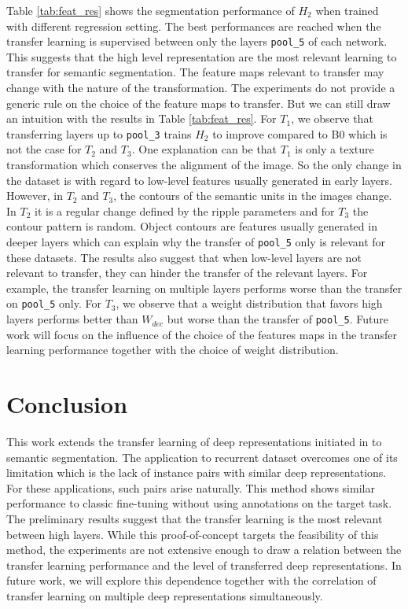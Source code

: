 \documentclass{bmvc2k}
\begin{document}
Table \ref{tab:feat_res} shows the segmentation performance of $H_2$ when trained 
with different regression setting. The best performances are reached
when the transfer learning
is supervised between only the layers \texttt{pool\_5} of each network. 
This suggests that
 the high level representation are the most relevant learning to transfer for 
semantic segmentation. 
The feature maps relevant to transfer may change with the nature of 
the transformation. The experiments do not provide a generic rule on
the choice of the feature maps to transfer. But we can still draw an intuition with 
the results in Table \ref{tab:feat_res}. 
For $T_1$, we observe that transferring layers up to {\tt pool\_3} trains $H_2$ to 
improve compared to B0 which is not the case for $T_2$ and $T_3$. One explanation 
can be that $T_1$ is only a texture transformation which conserves the alignment 
of the image. So the only change in the dataset is with regard to low-level
features usually generated in early layers. However, in $T_2$ and $T_3$, the 
contours of the semantic units in the images change. In $T_2$ it is a regular 
change defined by the ripple parameters and for $T_3$ the contour pattern is 
random. Object contours are features usually generated in deeper layers which 
can explain why the transfer of \texttt{pool\_5} only is relevant for these datasets.
The results also suggest that when low-level layers are not relevant to transfer, they
can hinder the transfer of the relevant layers. For example, the 
transfer learning on multiple layers performs worse than the transfer on \texttt{pool\_5} only. 
For $T_3$, we observe that a weight distribution that favors high layers performs
better than $W_{dec}$ but worse than the transfer of \texttt{pool\_5}. 
Future work will focus on the influence of the choice of the features maps in 
the transfer learning performance together with the choice of weight distribution. 

\section{Conclusion}
This work extends the transfer learning of deep representations initiated 
in \cite{bengio2012deep} to semantic segmentation. The application to recurrent
dataset overcomes one of its limitation which is the lack of instance pairs
with similar deep representations. For these applications, such pairs arise 
naturally.
This method shows similar performance to classic fine-tuning without using 
annotations on the target task. The preliminary results suggest that 
the transfer learning is the most relevant between high layers. 
While this proof-of-concept targets the feasibility of this method, the
experiments are not extensive enough to draw a relation between the transfer
learning performance and the level of transferred deep representations. 
In future work, we will explore this dependence together with the correlation 
of transfer learning on multiple deep representations simultaneously.


\end{document}
